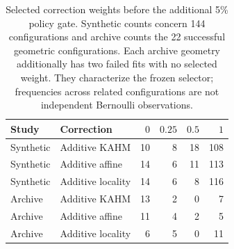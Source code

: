 \begin{table}[!htbp]
\centering\small\setlength{\tabcolsep}{4pt}
\caption{Selected correction weights before the additional 5\% policy gate. Synthetic counts concern 144 configurations and archive counts the 22 successful geometric configurations. Each archive geometry additionally has two failed fits with no selected weight. They characterize the frozen selector; frequencies across related configurations are not independent Bernoulli observations.}
\label{tab:utility-gamma}
\begin{tabular}{llrrrr}
\toprule
Study & Correction & $0$ & $0.25$ & $0.5$ & $1$ \\
\midrule
Synthetic & Additive KAHM & 10 & 8 & 18 & 108 \\
Synthetic & Additive affine & 14 & 6 & 11 & 113 \\
Synthetic & Additive locality & 14 & 6 & 8 & 116 \\
Archive & Additive KAHM & 13 & 2 & 0 & 7 \\
Archive & Additive affine & 11 & 4 & 2 & 5 \\
Archive & Additive locality & 6 & 5 & 0 & 11 \\
\bottomrule
\end{tabular}
\end{table}
